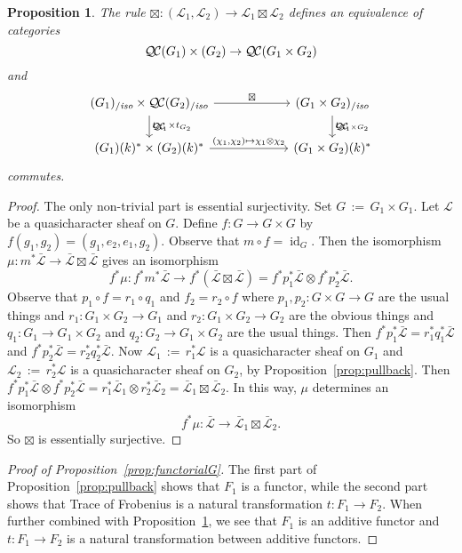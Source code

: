 \documentclass[11pt]{amsart}
\theoremstyle{plain}
\newtheorem{proposition}[theorem]{Proposition}
\theoremstyle{definition}
\theoremstyle{remark}
\newcommand{\Fq}{k}
\DeclareMathOperator{\id}{id}
\newcommand{\ceq}{{\, :=\, }}
\newcommand{\cs}[1]{{\mathcal{#1}}}
\newcommand{\gcs}[1]{{\mathcal{\bar #1}}}
\newcommand{\QC}{{\mathcal{Q\hskip-0.8pt C}}}
\newcommand{\QCiso}[1]{\QC(#1)_{/\textit{iso}}}
\newcommand{\trFrob}[1]{t_{#1}}
\begin{document}
\begin{proposition}\label{prop:product}
The rule $\boxtimes : (\cs{L}_1,\cs{L}_2)\to \cs{L}_1\boxtimes\cs{L}_2$ defines an equivalence of categories 
\[
\QC(G_1)\times(G_2) \to \QC(G_1\times G_2)
\]
and 
\[
\begin{tikzcd}[column sep=60]
\arrow{d}{\trFrob{G_1} \times \trFrob{G_2}} \QCiso{G_1}\times \QCiso{G_2} \arrow{r}{\boxtimes} & \arrow{d}{\trFrob{G_1\times G_2}} \QCiso{G_1\times G_2}\\
(G_1)(\Fq)^*\times (G_2)(\Fq)^* \arrow{r}{(\chi_1,\chi_2)\mapsto \chi_1\otimes \chi_2}  & (G_1\times G_2)(\Fq)^*
\end{tikzcd}
\]
commutes.
\end{proposition}

\begin{proof}
The only non-trivial part is essential surjectivity. Set $G \ceq G_1\times G_1$. Let $\cs{L}$ be a quasicharacter sheaf on $G$. Define $f : G\to G\times G$ by $f(g_1,g_2) = (g_1,e_2,e_1,g_2)$. Observe that $m\circ f = \id_G$. 
Then the isomorphism $\mu : m^* \gcs{L} \to \gcs{L}\boxtimes \gcs{L}$ gives an isomorphism
\[
f^*\mu : f^* m^* \gcs{L} \to f^*(\gcs{L}\boxtimes \gcs{L}) = f^*p_1^*\gcs{L}\otimes f^* p_2^*\gcs{L}.
\]
Observe that $p_1\circ f = r_1 \circ q_1$ and $f_2 = r_2\circ f$ where $p_1 , p_2 : G\times G \to G$ are the usual things and $r_1 : G_1\times G_2 \to G_1$ and $r_2 : G_1\times G_2 \to G_2$ are the obvious things and $q_1 : G_1\to G_1\times G_2$ and  $q_2 : G_2\to G_1\times G_2$ are the usual things. Then $f^*p_1^*\gcs{L} = r_1^* q_1^* \gcs{L}$ and $f^*p_2^*\gcs{L} = r_2^* q_2^* \gcs{L}$. Now $\cs{L}_1 \ceq r_1^* \cs{L}$ is a quasicharacter sheaf on $G_1$ and $\cs{L}_2 \ceq r_2^* \cs{L}$ is a quasicharacter sheaf on $G_2$, by Proposition~\ref{prop:pullback}. Then
$ f^*p_1^*\gcs{L}\otimes f^* p_2^*\gcs{L} = r_1^*\gcs{L}_1\otimes r_2^* \gcs{L}_2 = \gcs{L}_1\boxtimes \gcs{L}_2$. In this way, $\mu$ determines an isomorphism
\[
f^*\mu : \gcs{L} \to  \gcs{L}_1\boxtimes \gcs{L}_2.
\]
So $\boxtimes$ is essentially surjective.
\end{proof}

\begin{proof}[Proof of Proposition~\ref{prop:functorialG}]
The first part of Proposition~\ref{prop:pullback} shows that $F_1$ is a functor, while the second part shows that Trace of Frobenius is a natural transformation $t: F_1 \to F_2$. When further combined with Proposition~\ref{prop:product}, we see that $F_1$ is an additive functor and $t: F_1 \to F_2$ is a natural transformation between additive functors.
\end{proof}
\end{document}
